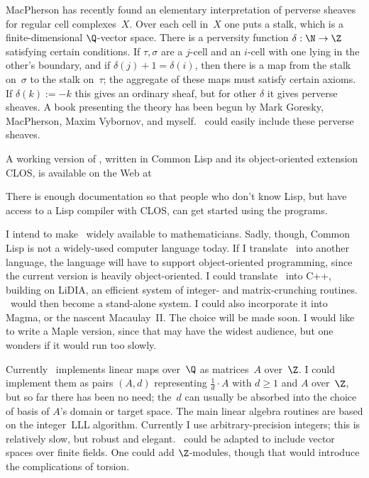 MacPherson has recently found an elementary interpretation of perverse
sheaves for regular cell complexes~$X$.  Over each cell in~$X$ one
puts a stalk, which is a finite-dimensional $\Q$-vector space.  There
is a perversity function $\delta : \N \to \Z$ satisfying certain
conditions.  If $\tau, \sigma$ are a $j$-cell and an $i$-cell with one
lying in the other's boundary, and if $\delta(j) + 1 = \delta(i)$,
then there is a map from the stalk on~$\sigma$ to the stalk on~$\tau$;
the aggregate of these maps must satisfy certain axioms.  If
$\delta(k) := -k$ this gives an ordinary sheaf, but for other $\delta$
it gives perverse sheaves.  A book presenting the theory has been
begun by Mark Goresky, MacPherson, Maxim Vybornov, and myself.  \shh\
could easily include these perverse sheaves.

 A working version of \shh, written in
Common Lisp and its object-oriented extension CLOS, is available on
the Web at

\newline There is
enough documentation so that people who don't know Lisp, but have
access to a Lisp compiler with CLOS, can get started using the
programs.

 I intend to make \shh\ widely
available to mathematicians.  Sadly, though, Common Lisp is not a
widely-used computer language today.  If I translate \shh\ into
another language, the language will have to support object-oriented
programming, since the current version is heavily object-oriented.  I
could translate \shh\ into C++, building on LiDIA, an efficient system
of integer- and matrix-crunching routines.  \shh\ would then become a
stand-alone system.  I could also incorporate it into Magma, or the
nascent Macaulay~II.  The choice will be made soon.  I would like to
write a Maple version, since that may have the widest audience, but
one wonders if it would run too slowly.

Currently \shh\ implements linear maps over~$\Q$ as matrices~$A$
over~$\Z$.  I could implement them as pairs $(A,d)$ representing
$\frac 1 d \cdot A$ with $d\ge 1$ and $A$ over~$\Z$, but so far there
has been no need; the~$d$ can usually be absorbed into the choice of
basis of $A$'s domain or target space.  The main linear algebra
routines are based on the integer~LLL algorithm.  Currently I use
arbitrary-precision integers; this is relatively slow, but robust and
elegant.  \shh\ could be adapted to include vector spaces over finite
fields.  One could add $\Z$-modules, though that would introduce the
complications of torsion.


